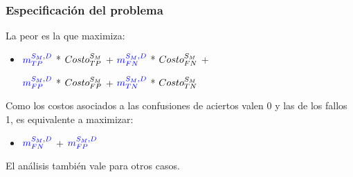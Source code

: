 \begin{frame}
\frametitle{Especificaci\'on del problema}
La peor es la que maximiza: \\
\vspace{3mm}
\begin{itemize}
\item {$\STP$ * $\SCTP$ + $\SFN$ * $\SCFN$ + 

$\SFP$ * $\SCFP$ + $\STN$ * $\SCTN$}
\end{itemize}
\vspace{3mm}
Como los costos asociados a las confusiones de aciertos valen 0 y las de los fallos 1, es equivalente a maximizar: \\
\vspace{3mm}
\begin{itemize}
\item $\SFN$ + $\SFP$
\end{itemize}
\vspace{3mm}
El an\'alisis tambi\'en vale para otros casos.
\end{frame}